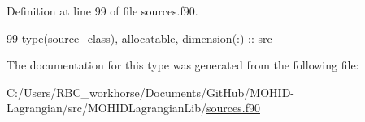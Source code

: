 Definition at line 99 of file sources.\+f90.


\begin{DoxyCode}
99         \textcolor{keywordtype}{type}(source\_class), \textcolor{keywordtype}{allocatable}, \textcolor{keywordtype}{dimension(:)} :: src
\end{DoxyCode}


The documentation for this type was generated from the following file\+:\begin{DoxyCompactItemize}
\item 
C\+:/\+Users/\+R\+B\+C\+\_\+workhorse/\+Documents/\+Git\+Hub/\+M\+O\+H\+I\+D-\/\+Lagrangian/src/\+M\+O\+H\+I\+D\+Lagrangian\+Lib/\mbox{\hyperlink{sources_8f90}{sources.\+f90}}\end{DoxyCompactItemize}
